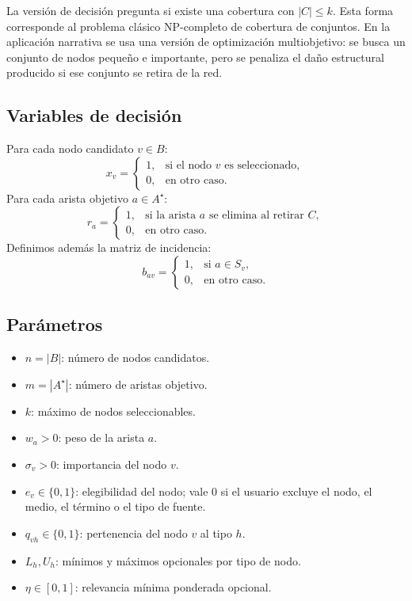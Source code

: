 \documentclass[11pt]{article}
\begin{document}
La versión de decisión pregunta si existe una cobertura con $|C|\leq k$. Esta
forma corresponde al problema clásico NP-completo de cobertura de conjuntos. En
la aplicación narrativa se usa una versión de optimización multiobjetivo: se
busca un conjunto de nodos pequeño e importante, pero se penaliza el daño
estructural producido si ese conjunto se retira de la red.

\subsection{Variables de decisión}

Para cada nodo candidato $v\in B$:
\[
x_v =
\begin{cases}
1, & \text{si el nodo }v\text{ es seleccionado},\\
0, & \text{en otro caso}.
\end{cases}
\]
Para cada arista objetivo $a\in A^\star$:
\[
r_a =
\begin{cases}
1, & \text{si la arista }a\text{ se elimina al retirar }C,\\
0, & \text{en otro caso}.
\end{cases}
\]
Definimos además la matriz de incidencia:
\[
b_{av} =
\begin{cases}
1, & \text{si }a\in S_v,\\
0, & \text{en otro caso}.
\end{cases}
\]

\subsection{Parámetros}

\begin{itemize}
  \item $n=|B|$: número de nodos candidatos.
  \item $m=|A^\star|$: número de aristas objetivo.
  \item $k$: máximo de nodos seleccionables.
  \item $w_a>0$: peso de la arista $a$.
  \item $\sigma_v>0$: importancia del nodo $v$.
  \item $e_v\in\{0,1\}$: elegibilidad del nodo; vale $0$ si el usuario excluye
  el nodo, el medio, el término o el tipo de fuente.
  \item $q_{vh}\in\{0,1\}$: pertenencia del nodo $v$ al tipo $h$.
  \item $L_h,U_h$: mínimos y máximos opcionales por tipo de nodo.
  \item $\eta\in[0,1]$: relevancia mínima ponderada opcional.
\end{itemize}
\end{document}
